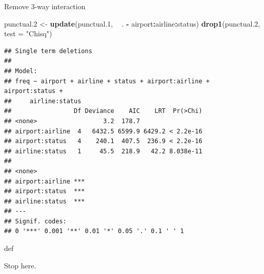 \documentclass[ignorenonframetext,]{beamer}
\newenvironment{Shaded}{\begin{snugshade}}{\end{snugshade}}
\newcommand{\DataTypeTok}[1]{\textcolor[rgb]{0.13,0.29,0.53}{#1}}
\newcommand{\FloatTok}[1]{\textcolor[rgb]{0.00,0.00,0.81}{#1}}
\newcommand{\KeywordTok}[1]{\textcolor[rgb]{0.13,0.29,0.53}{\textbf{#1}}}
\newcommand{\NormalTok}[1]{#1}
\newcommand{\OperatorTok}[1]{\textcolor[rgb]{0.81,0.36,0.00}{\textbf{#1}}}
\newcommand{\StringTok}[1]{\textcolor[rgb]{0.31,0.60,0.02}{#1}}
\begin{document}
\begin{frame}[fragile]{Remove 3-way interaction}
\protect\hypertarget{remove-3-way-interaction}{}

\begin{Shaded}
\begin{Highlighting}[]
\NormalTok{punctual}\FloatTok{.2}\NormalTok{ <-}\StringTok{ }\KeywordTok{update}\NormalTok{(punctual}\FloatTok{.1}\NormalTok{, }\OperatorTok{~}\StringTok{ }\NormalTok{. }\OperatorTok{-}\StringTok{ }\NormalTok{airport}\OperatorTok{:}\NormalTok{airline}\OperatorTok{:}\NormalTok{status)}
\KeywordTok{drop1}\NormalTok{(punctual}\FloatTok{.2}\NormalTok{, }\DataTypeTok{test =} \StringTok{"Chisq"}\NormalTok{)}
\end{Highlighting}
\end{Shaded}

\begin{verbatim}
## Single term deletions
## 
## Model:
## freq ~ airport + airline + status + airport:airline + airport:status + 
##     airline:status
##                 Df Deviance    AIC    LRT  Pr(>Chi)
## <none>                  3.2  178.7                 
## airport:airline  4   6432.5 6599.9 6429.2 < 2.2e-16
## airport:status   4    240.1  407.5  236.9 < 2.2e-16
## airline:status   1     45.5  218.9   42.2 8.038e-11
##                    
## <none>             
## airport:airline ***
## airport:status  ***
## airline:status  ***
## ---
## Signif. codes:  
## 0 '***' 0.001 '**' 0.01 '*' 0.05 '.' 0.1 ' ' 1
\end{verbatim}

def

Stop here.

\end{frame}
\end{document}
